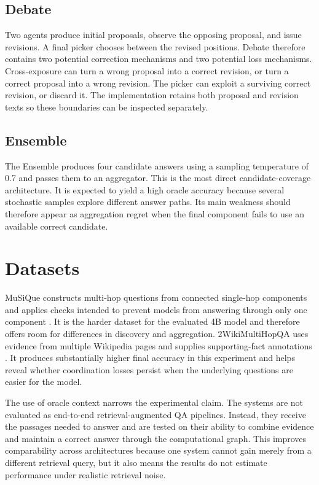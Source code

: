 \subsection{Debate}

Two agents produce initial proposals, observe the opposing proposal, and issue revisions. A final picker chooses between the revised positions. Debate therefore contains two potential correction mechanisms and two potential loss mechanisms. Cross-exposure can turn a wrong proposal into a correct revision, or turn a correct proposal into a wrong revision. The picker can exploit a surviving correct revision, or discard it. The implementation retains both proposal and revision texts so these boundaries can be inspected separately.

\subsection{Ensemble}

The Ensemble produces four candidate answers using a sampling temperature of 0.7 and passes them to an aggregator. This is the most direct candidate-coverage architecture. It is expected to yield a high oracle accuracy because several stochastic samples explore different answer paths. Its main weakness should therefore appear as aggregation regret when the final component fails to use an available correct candidate.

\section{Datasets}

MuSiQue constructs multi-hop questions from connected single-hop components and applies checks intended to prevent models from answering through only one component \citep{trivedi2022musique}. It is the harder dataset for the evaluated 4B model and therefore offers room for differences in discovery and aggregation. 2WikiMultiHopQA uses evidence from multiple Wikipedia pages and supplies supporting-fact annotations \citep{ho2020twowiki}. It produces substantially higher final accuracy in this experiment and helps reveal whether coordination losses persist when the underlying questions are easier for the model.

The use of oracle context narrows the experimental claim. The systems are not evaluated as end-to-end retrieval-augmented QA pipelines. Instead, they receive the passages needed to answer and are tested on their ability to combine evidence and maintain a correct answer through the computational graph. This improves comparability across architectures because one system cannot gain merely from a different retrieval query, but it also means the results do not estimate performance under realistic retrieval noise.

